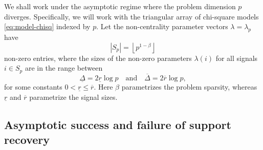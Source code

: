 
We shall work under the asymptotic regime where the problem dimension $p$ diverges.
Specifically, we will work with the triangular array of chi-square models \eqref{eq:model-chisq} indexed by $p$.
Let the non-centrality parameter vectors $\lambda = \lambda_p$ have 
\begin{equation} \label{eq:signal-sparsity}
    |S_p| = \left\lfloor p^{1-\beta} \right\rfloor
\end{equation}
non-zero entries, where the sizes of the non-zero parameters $\lambda(i)$ for all signals $i\in S_p$ are in the range between
\begin{equation} \label{eq:signal-size}
    \underline{\Delta} = 2\underline{r}\log{p}
    \quad\text{and}\quad
    \overline{\Delta} = 2\overline{r}\log{p},
\end{equation}
for some constants $0<\underline{r}\le\overline{r}$.
Here $\beta$ parametrizes the problem sparsity, whereas $\underline{r}$ and $\overline{r}$ parametrize the signal sizes.

\subsection{Asymptotic success and failure of support recovery}

